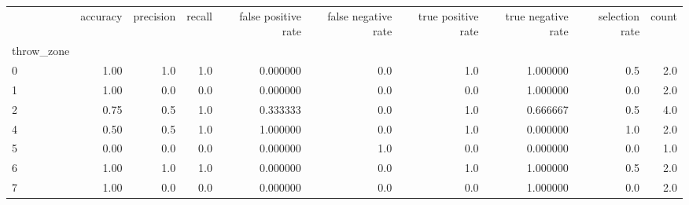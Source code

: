 \begin{tabular}{lrrrrrrrrr}
\toprule
{} &  accuracy &  precision &  recall &  false positive rate &  false negative rate &  true positive rate &  true negative rate &  selection rate &  count \\
throw\_zone &           &            &         &                      &                      &                     &                     &                 &        \\
\midrule
0          &      1.00 &        1.0 &     1.0 &             0.000000 &                  0.0 &                 1.0 &            1.000000 &             0.5 &    2.0 \\
1          &      1.00 &        0.0 &     0.0 &             0.000000 &                  0.0 &                 0.0 &            1.000000 &             0.0 &    2.0 \\
2          &      0.75 &        0.5 &     1.0 &             0.333333 &                  0.0 &                 1.0 &            0.666667 &             0.5 &    4.0 \\
4          &      0.50 &        0.5 &     1.0 &             1.000000 &                  0.0 &                 1.0 &            0.000000 &             1.0 &    2.0 \\
5          &      0.00 &        0.0 &     0.0 &             0.000000 &                  1.0 &                 0.0 &            0.000000 &             0.0 &    1.0 \\
6          &      1.00 &        1.0 &     1.0 &             0.000000 &                  0.0 &                 1.0 &            1.000000 &             0.5 &    2.0 \\
7          &      1.00 &        0.0 &     0.0 &             0.000000 &                  0.0 &                 0.0 &            1.000000 &             0.0 &    2.0 \\
\bottomrule
\end{tabular}
